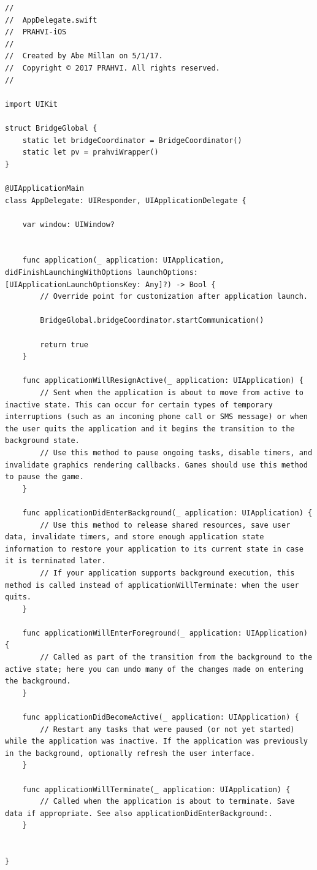 \begin{lstlisting}
//
//  AppDelegate.swift
//  PRAHVI-iOS
//
//  Created by Abe Millan on 5/1/17.
//  Copyright © 2017 PRAHVI. All rights reserved.
//

import UIKit

struct BridgeGlobal {
    static let bridgeCoordinator = BridgeCoordinator()
    static let pv = prahviWrapper()
}

@UIApplicationMain
class AppDelegate: UIResponder, UIApplicationDelegate {

    var window: UIWindow?


    func application(_ application: UIApplication, didFinishLaunchingWithOptions launchOptions: [UIApplicationLaunchOptionsKey: Any]?) -> Bool {
        // Override point for customization after application launch.
        
        BridgeGlobal.bridgeCoordinator.startCommunication()
        
        return true
    }

    func applicationWillResignActive(_ application: UIApplication) {
        // Sent when the application is about to move from active to inactive state. This can occur for certain types of temporary interruptions (such as an incoming phone call or SMS message) or when the user quits the application and it begins the transition to the background state.
        // Use this method to pause ongoing tasks, disable timers, and invalidate graphics rendering callbacks. Games should use this method to pause the game.
    }

    func applicationDidEnterBackground(_ application: UIApplication) {
        // Use this method to release shared resources, save user data, invalidate timers, and store enough application state information to restore your application to its current state in case it is terminated later.
        // If your application supports background execution, this method is called instead of applicationWillTerminate: when the user quits.
    }

    func applicationWillEnterForeground(_ application: UIApplication) {
        // Called as part of the transition from the background to the active state; here you can undo many of the changes made on entering the background.
    }

    func applicationDidBecomeActive(_ application: UIApplication) {
        // Restart any tasks that were paused (or not yet started) while the application was inactive. If the application was previously in the background, optionally refresh the user interface.
    }

    func applicationWillTerminate(_ application: UIApplication) {
        // Called when the application is about to terminate. Save data if appropriate. See also applicationDidEnterBackground:.
    }


}
\end{lstlisting}

